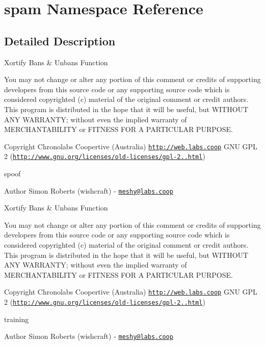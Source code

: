 \hypertarget{namespacespam}{\section{spam Namespace Reference}
\label{namespacespam}
}


\subsection{Detailed Description}
Xortify Bans \& Unbans Function

You may not change or alter any portion of this comment or credits of supporting developers from this source code or any supporting source code which is considered copyrighted (c) material of the original comment or credit authors. This program is distributed in the hope that it will be useful, but W\-I\-T\-H\-O\-U\-T A\-N\-Y W\-A\-R\-R\-A\-N\-T\-Y; without even the implied warranty of M\-E\-R\-C\-H\-A\-N\-T\-A\-B\-I\-L\-I\-T\-Y or F\-I\-T\-N\-E\-S\-S F\-O\-R A P\-A\-R\-T\-I\-C\-U\-L\-A\-R P\-U\-R\-P\-O\-S\-E.

\begin{DoxyCopyright}{Copyright}
Chronolabs Coopertive (Australia) \href{http://web.labs.coop}{\tt http\-://web.\-labs.\-coop}  G\-N\-U G\-P\-L 2 (\href{http://www.gnu.org/licenses/old-licenses/gpl-2.0.html}{\tt http\-://www.\-gnu.\-org/licenses/old-\/licenses/gpl-\/2..\-html})
\end{DoxyCopyright}
spoof \begin{DoxyAuthor}{Author}
Simon Roberts (wishcraft) -\/ \href{mailto:meshy@labs.coop}{\tt meshy@labs.\-coop}
\end{DoxyAuthor}
Xortify Bans \& Unbans Function

You may not change or alter any portion of this comment or credits of supporting developers from this source code or any supporting source code which is considered copyrighted (c) material of the original comment or credit authors. This program is distributed in the hope that it will be useful, but W\-I\-T\-H\-O\-U\-T A\-N\-Y W\-A\-R\-R\-A\-N\-T\-Y; without even the implied warranty of M\-E\-R\-C\-H\-A\-N\-T\-A\-B\-I\-L\-I\-T\-Y or F\-I\-T\-N\-E\-S\-S F\-O\-R A P\-A\-R\-T\-I\-C\-U\-L\-A\-R P\-U\-R\-P\-O\-S\-E.

\begin{DoxyCopyright}{Copyright}
Chronolabs Coopertive (Australia) \href{http://web.labs.coop}{\tt http\-://web.\-labs.\-coop}  G\-N\-U G\-P\-L 2 (\href{http://www.gnu.org/licenses/old-licenses/gpl-2.0.html}{\tt http\-://www.\-gnu.\-org/licenses/old-\/licenses/gpl-\/2..\-html})
\end{DoxyCopyright}
training \begin{DoxyAuthor}{Author}
Simon Roberts (wishcraft) -\/ \href{mailto:meshy@labs.coop}{\tt meshy@labs.\-coop} 
\end{DoxyAuthor}
